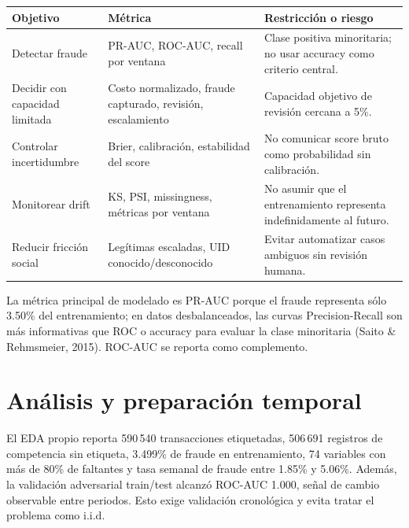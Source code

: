 \documentclass[11pt,letterpaper]{article}
\begin{document}
\begin{table}[H]\centering\small
\begin{tabularx}{\linewidth}{@{}p{.23\linewidth}X X@{}}\toprule
Objetivo & Métrica & Restricción o riesgo\\\midrule
Detectar fraude & PR-AUC, ROC-AUC, recall por ventana & Clase positiva minoritaria; no usar accuracy como criterio central.\\
Decidir con capacidad limitada & Costo normalizado, fraude capturado, revisión, escalamiento & Capacidad objetivo de revisión cercana a 5\%.\\
Controlar incertidumbre & Brier, calibración, estabilidad del score & No comunicar score bruto como probabilidad sin calibración.\\
Monitorear drift & KS, PSI, missingness, métricas por ventana & No asumir que el entrenamiento representa indefinidamente al futuro.\\
Reducir fricción social & Legítimas escaladas, UID conocido/desconocido & Evitar automatizar casos ambiguos sin revisión humana.\\\bottomrule
\end{tabularx}
\end{table}

La métrica principal de modelado es PR-AUC porque el fraude representa sólo 3.50\% del entrenamiento; en datos desbalanceados, las curvas Precision-Recall son más informativas que ROC o accuracy para evaluar la clase minoritaria (Saito \& Rehmsmeier, 2015). ROC-AUC se reporta como complemento.

\section{Análisis y preparación temporal}

El EDA propio reporta 590\,540 transacciones etiquetadas, 506\,691 registros de competencia sin etiqueta, 3.499\% de fraude en entrenamiento, 74 variables con más de 80\% de faltantes y tasa semanal de fraude entre 1.85\% y 5.06\%. Además, la validación adversarial train/test alcanzó ROC-AUC 1.000, señal de cambio observable entre periodos. Esto exige validación cronológica y evita tratar el problema como i.i.d.

\begin{center}
\end{center}
\end{document}
